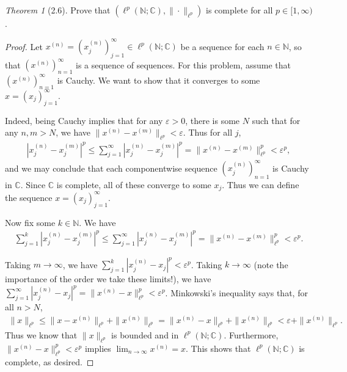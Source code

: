 \documentclass[12pt]{article}
\theoremstyle{remark}
\theoremstyle{named}
\newtheorem*{theorem}{Theorem}
\newcommand{\e}{\varepsilon}
\newcommand{\N}{\mathbb N}
\newcommand{\C}{\mathbb C}
\newcommand{\abs}[1]{|#1|}
\newcommand{\nlp}[1]{\|{#1}\|_{\ell^p}}
\begin{document}
\begin{theorem}[2.6]
    Prove that \((\ell^p(\N;\C), \|\cdot\|_{\ell^p})\) is complete for all \(p \in [1, \infty)\).
\end{theorem}

\begin{proof}
    Let \(x^{(n)} = (x_j^{(n)})_{j = 1}^\infty \in \ell^p(\N;\C)\) be a sequence for each \(n \in \N\), so that \((x^{(n)})_{n = 1}^\infty\) is a sequence of sequences. For this problem, assume that \((x^{(n)})_{n = 1}^\infty\) is Cauchy. We want to show that it converges to some \(x = (x_j)_{j = 1}^\infty\). 

    Indeed, being Cauchy implies that for any \(\e > 0\), there is some \(N\) such that for any \(n, m > N\), we have \(\nlp{x^{(n)} - x^{(m)}} < \e\). Thus for all \(j\), 
    \begin{align*}
        \abs{x_j^{(n)} - x_j^{(m)}}^p \leq \sum_{j = 1}^{\infty} \abs{x_j^{(n)} - x_j^{(m)}}^p = \nlp{x^{(n)} - x^{(m)}}^p < \e^p,
    \end{align*}
    and we may conclude that each componentwise sequence \((x_j^{(n)})_{n = 1}^\infty\) is Cauchy in \(\C\). Since \(\C\) is complete, all of these converge to some \(x_j\). Thus we can define the sequence \(x = (x_j)_{j = 1}^\infty\). 

    Now fix some \(k \in \N\). We have 
    \begin{align*}
        \sum_{j = 1}^{k} \abs{x_j^{(n)} - x_j^{(m)}}^p \leq \sum_{j = 1}^{\infty} \abs{x_j^{(n)} - x_j^{(m)}}^p = \nlp{x^{(n)} - x^{(m)}}^p < \e^p.
    \end{align*}

    Taking \(m \to \infty\), we have \(\sum_{j = 1}^{k} \abs{x_j^{(n)} - x_j}^p < \e^p\). Taking \(k \to \infty\) (note the importance of the order we take these limits!), we have \(\sum_{j = 1}^{\infty} \abs{x_j^{(n)} - x_j}^p = \nlp{x^{(n)} - x}^p < \e^p\). Minkowski's inequality says that, for all \(n > N\),
    \begin{align*}
        \nlp{x} \leq \nlp{x - x^{(n)}} + \nlp{x^{(n)}} = \nlp{x^{(n)} - x} + \nlp{x^{(n)}} < \e + \nlp{x^{(n)}}.
    \end{align*}
    Thus we know that \(\nlp{x}\) is bounded and in \(\ell^p(\N;\C)\). Furthermore, \(\nlp{x^{(n)} - x}^p < \e^p\) implies \(\lim_{n \to \infty} x^{(n)} = x\). This shows that \(\ell^p(\N;\C)\) is complete, as desired.
\end{proof}
\end{document}
